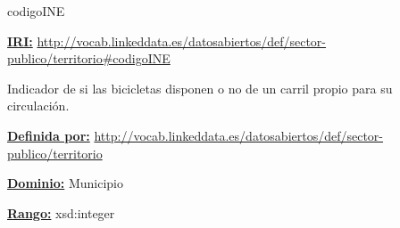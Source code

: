 \begin{mybox}{codigoINE}
\begin{flushleft}
\underline{\textbf{IRI:}}
\url{http://vocab.linkeddata.es/datosabiertos/def/sector-publico/territorio#codigoINE}
\newline

Indicador de si las bicicletas disponen o no de un carril propio para su circulación.
\newline


\underline{\textbf{Definida por:}}\newline
\url{http://vocab.linkeddata.es/datosabiertos/def/sector-publico/territorio}
\newline

\underline{\textbf{Dominio:}}
	Municipio
\newline

\underline{\textbf{Rango:}}
	xsd:integer
\newline

\end{flushleft}
\end{mybox}


























